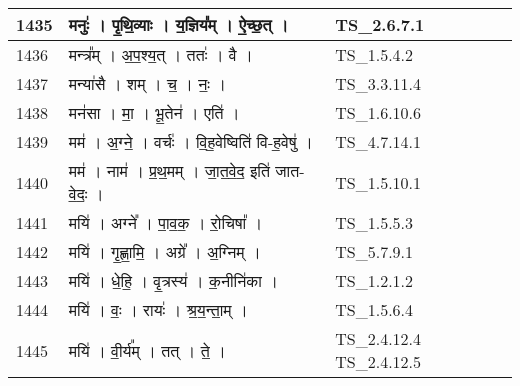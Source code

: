\documentclass[17pt]{extarticle}
\begin{document}
\begin{longtable}{||p{0.4in}||p{4.9in}||p{0.9in}||}
    \hline
        
    1435 & मनुः॑   ।   पृ॒थि॒व्याः   ।   य॒ज्ञिय᳚म्   ।   ऐ॒च्छ॒त्   ।    & TS\_2.6.7.1       \\
    
    \hline
        
    1436 & मन्त्र᳚म्   ।   अ॒प॒श्य॒त्   ।   ततः॑   ।   वै   ।    & TS\_1.5.4.2       \\
    
    \hline
        
    1437 & मन्या॑सै   ।   शम्   ।   च॒   ।   नः॒   ।    & TS\_3.3.11.4       \\
    
    \hline
        
    1438 & मन॑सा   ।   मा॒   ।   भू॒तेन॑   ।   एति॑   ।    & TS\_1.6.10.6       \\
    
    \hline
        
    1439 & मम॑   ।   अ॒ग्ने॒   ।   वर्चः॑   ।   वि॒ह॒वेष्विति॑ वि{-}ह॒वेषु॑   ।    & TS\_4.7.14.1       \\
    
    \hline
        
    1440 & मम॑   ।   नाम॑   ।   प्र॒थ॒मम्   ।   जा॒त॒वे॒द॒ इति॑ जात{-}वे॒दः॒   ।    & TS\_1.5.10.1       \\
    
    \hline
        
    1441 & मयि॑   ।   अग्ने᳚   ।   पा॒व॒क॒   ।   रो॒चिषा᳚   ।    & TS\_1.5.5.3       \\
    
    \hline
        
    1442 & मयि॑   ।   गृ॒ह्णा॒मि॒   ।   अग्रे᳚   ।   अ॒ग्निम्   ।    & TS\_5.7.9.1       \\
    
    \hline
        
    1443 & मयि॑   ।   धे॒हि॒   ।   वृ॒त्रस्य॑   ।   क॒नीनि॑का   ।    & TS\_1.2.1.2       \\
    
    \hline
        
    1444 & मयि॑   ।   वः॒   ।   रायः॑   ।   श्र॒य॒न्ता॒म्   ।    & TS\_1.5.6.4       \\
    
    \hline
        
    1445 & मयि॑   ।   वी॒र्य᳚म्   ।   तत्   ।   ते॒   ।    & TS\_2.4.12.4 TS\_2.4.12.5       \\
    

\end{longtable}
\end{document}
